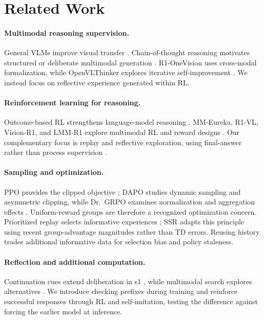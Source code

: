 \documentclass[twocolumn]{article}
\begin{document}
\section{Related Work}
\label{sec:related}

\paragraph{Multimodal reasoning supervision.}
General VLMs improve visual transfer \citep{qwen2_5_vl,internvl_2_5,llavaov}. Chain-of-thought reasoning \citep{wei2022chain} motivates structured or deliberate multimodal generation \citep{llavacot,Mulberry,virgo}. R1-OneVision uses cross-modal formalization, while OpenVLThinker explores iterative self-improvement \citep{R1OneVision,OpenVLThinker}. We instead focus on reflective experience generated within RL.

\paragraph{Reinforcement learning for reasoning.}
Outcome-based RL strengthens language-model reasoning \citep{deepseek-r1,openai-o1}. MM-Eureka, R1-VL, Vision-R1, and LMM-R1 explore multimodal RL and reward designs \citep{mmeureka,r1vl,vision-r1,lmm-r1}. Our complementary focus is replay and reflective exploration, using final-answer rather than process supervision \citep{letsverify}.

\paragraph{Sampling and optimization.}
PPO provides the clipped objective \citep{ppo}; DAPO studies dynamic sampling and asymmetric clipping, while Dr.~GRPO examines normalization and aggregation effects \citep{dapo,drgrpo}. Uniform-reward groups are therefore a recognized optimization concern. Prioritized replay selects informative experiences \citep{per}; SSR adapts this principle using recent group-advantage magnitudes rather than TD errors. Reusing history trades additional informative data for selection bias and policy staleness.

\paragraph{Reflection and additional computation.}
Continuation cues extend deliberation in s1 \citep{s1}, while multimodal search explores alternatives \citep{Mulberry}. We introduce checking prefixes during training and reinforce successful responses through RL and self-imitation, testing the difference against forcing the earlier model at inference.
\end{document}

